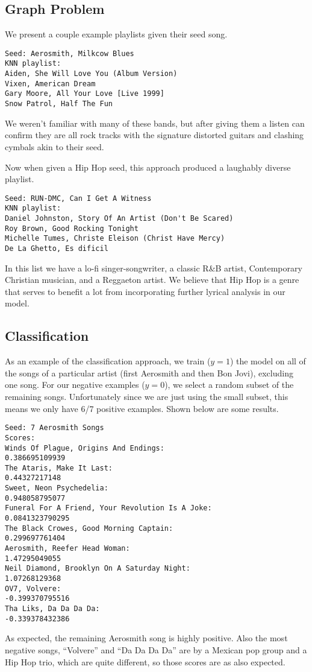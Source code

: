 \documentclass[10pt,journal,compsoc]{IEEEtran}
\begin{document}
\subsection{Graph Problem}
We present a couple example playlists given their seed song.
\begin{lstlisting}
Seed: Aerosmith, Milkcow Blues
KNN playlist:
Aiden, She Will Love You (Album Version)
Vixen, American Dream
Gary Moore, All Your Love [Live 1999]
Snow Patrol, Half The Fun
\end{lstlisting}
We weren't familiar with many of these bands, but after giving them a listen can confirm they are all rock tracks with the signature distorted guitars and clashing cymbals akin to their seed.

Now when given a Hip Hop seed, this approach produced a laughably diverse playlist.
\begin{lstlisting}
Seed: RUN-DMC, Can I Get A Witness
KNN playlist:
Daniel Johnston, Story Of An Artist (Don't Be Scared)
Roy Brown, Good Rocking Tonight
Michelle Tumes, Christe Eleison (Christ Have Mercy)
De La Ghetto, Es dificil
\end{lstlisting}
In this list we have a lo-fi singer-songwriter, a classic R\&B artist, Contemporary Christian musician, and a Reggaeton artist. We believe that Hip Hop is a genre that serves to benefit a lot from incorporating further lyrical analysis in our model.

\subsection{Classification}
As an example of the classification approach, we train ($y=1$) the model on all of the songs of a particular artist (first Aerosmith and then Bon Jovi), excluding one song. For our negative examples ($y=0$), we select a random subset of the remaining songs. Unfortunately since we are just using the small subset, this means we only have 6/7 positive examples. Shown below are some results.

\begin{lstlisting}
Seed: 7 Aerosmith Songs
Scores:
Winds Of Plague, Origins And Endings:
0.386695109939
The Ataris, Make It Last:
0.44327217148
Sweet, Neon Psychedelia:
0.948058795077
Funeral For A Friend, Your Revolution Is A Joke:
0.0841323790295
The Black Crowes, Good Morning Captain:
0.299697761404
Aerosmith, Reefer Head Woman:
1.47295049055
Neil Diamond, Brooklyn On A Saturday Night:
1.07268129368
OV7, Volvere:
-0.399370795516
Tha Liks, Da Da Da Da:
-0.339378432386
\end{lstlisting}
As expected, the remaining Aerosmith song is highly positive. Also the most negative songs, ``Volvere'' and ``Da Da Da Da'' are by a Mexican pop group and a Hip Hop trio, which are quite different, so those scores are as also expected.
\end{document}
